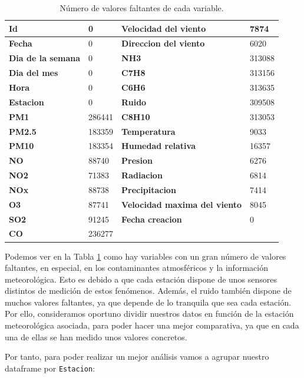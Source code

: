 \documentclass[
]{article}
\begin{document}
\begin{table}[ht]
\centering
\begin{tabular}{|l|l|l|l|}
\hline
\textbf{Id} & 0 & \textbf{Velocidad del viento} & 7874 \\ \hline
\textbf{Fecha} & 0 & \textbf{Direccion del viento} & 6020 \\ \hline
\textbf{Dia de la semana} & 0 &\textbf{NH3} & 313088 \\ \hline
\textbf{Dia del mes} & 0 & \textbf{C7H8} & 313156 \\ \hline
\textbf{Hora} & 0 & \textbf{C6H6} & 313635 \\ \hline
\textbf{Estacion} & 0 & \textbf{Ruido} & 309508 \\ \hline
\textbf{PM1} & 286441 & \textbf{C8H10} & 313053 \\ \hline
\textbf{PM2.5} & 183359 & \textbf{Temperatura} & 9033 \\ \hline
\textbf{PM10} & 183354 & \textbf{Humedad relativa} & 16357 \\ \hline
\textbf{NO} & 88740 & \textbf{Presion} & 6276 \\ \hline
\textbf{NO2} & 71383 & \textbf{Radiacion} & 6814 \\ \hline
\textbf{NOx} & 88738 & \textbf{Precipitacion} & 7414 \\ \hline
\textbf{O3} & 87741 & \textbf{Velocidad maxima del viento} & 8045 \\ \hline
\textbf{SO2} & 91245 & \textbf{Fecha creacion} & 0 \\ \hline
\textbf{CO} & 236277 & & \\ \hline
\end{tabular}
\caption{Número de valores faltantes de cada variable.}
\label{tabla1}
\end{table}

Podemos ver en la Tabla \ref{tabla1} como hay variables con un gran
número de valores faltantes, en especial, en los contaminantes
atmosféricos y la información meteorológica. Esto es debido a que cada
estación dispone de unos sensores distintos de medición de estos
fenómenos. Además, el ruido también dispone de muchos valores faltantes,
ya que depende de lo tranquila que sea cada estación. Por ello,
consideramos oportuno dividir nuestros datos en función de la estación
meteorológica asociada, para poder hacer una mejor comparativa, ya que
en cada una de ellas se han medido unos valores concretos.

Por tanto, para poder realizar un mejor análisis vamos a agrupar nuestro
dataframe por \texttt{Estacion}:
\end{document}
